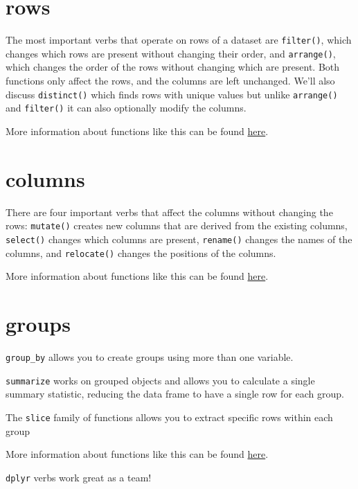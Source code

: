 \documentclass[
  letterpaper,
  DIV=11,
  numbers=noendperiod]{scrreprt}
\begin{document}
\section{rows}

The most important verbs that operate on rows of a dataset are
\texttt{filter()}, which changes which rows are present without changing
their order, and \texttt{arrange()}, which changes the order of the rows
without changing which are present. Both functions only affect the rows,
and the columns are left unchanged. We'll also discuss
\texttt{distinct()} which finds rows with unique values but unlike
\texttt{arrange()} and \texttt{filter()} it can also optionally modify
the columns.

More information about functions like this can be found
\href{https://r4ds.hadley.nz/data-transform\#rows}{here}.

\section{columns}

There are four important verbs that affect the columns without changing
the rows: \texttt{mutate()} creates new columns that are derived from
the existing columns, \texttt{select()} changes which columns are
present, \texttt{rename()} changes the names of the columns, and
\texttt{relocate()} changes the positions of the columns.

More information about functions like this can be found
\href{https://r4ds.hadley.nz/data-transform\#columns}{here}.

\section{groups}

\texttt{group\_by} allows you to create groups using more than one
variable.

\texttt{summarize} works on grouped objects and allows you to calculate
a single summary statistic, reducing the data frame to have a single row
for each group.

The \texttt{slice} family of functions allows you to extract specific
rows within each group

More information about functions like this can be found
\href{https://r4ds.hadley.nz/data-transform\#groups}{here}.

\begin{tcolorbox}[enhanced jigsaw, bottomtitle=1mm, bottomrule=.15mm, toprule=.15mm, opacityback=0, leftrule=.75mm, breakable, colback=white, toptitle=1mm, left=2mm, coltitle=black, titlerule=0mm, opacitybacktitle=0.6, title=\textcolor{quarto-callout-tip-color}{\faLightbulb}\hspace{0.5em}{Tip}, rightrule=.15mm, arc=.35mm, colframe=quarto-callout-tip-color-frame, colbacktitle=quarto-callout-tip-color!10!white]

\texttt{dplyr} verbs work great as a team!

\end{tcolorbox}
\end{document}
